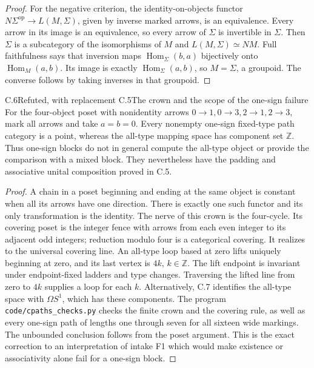 \begin{proof}
For the negative criterion, the identity-on-objects functor
$N\Sigma^{\mathrm{op}}\to L(M,\Sigma)$, given by inverse
marked arrows, is an equivalence. Every arrow in its image is an
equivalence, so every arrow of $\Sigma$ is invertible in $\Sigma$.
Then $\Sigma$ is a subcategory of the isomorphisms of $M$ and
$L(M,\Sigma)\simeq NM$. Full faithfulness says that inversion
maps $\operatorname{Hom}_\Sigma(b,a)$ bijectively onto
$\operatorname{Hom}_M(a,b)$. Its image is exactly
$\operatorname{Hom}_\Sigma(a,b)$, so $M=\Sigma$, a groupoid.
The converse follows by taking inverses in that groupoid.
\end{proof}

\begin{claim}{C.6}{Refuted, with replacement C.5}{The crown and the scope of the one-sign failure}
For the four-object poset with nonidentity arrows
$0\to1,0\to3,2\to1,2\to3$, mark all arrows and take $a=b=0$.
Every nonempty one-sign fixed-type path category is a point, whereas
the all-type mapping space has component set $\mathbb Z$.
Thus one-sign blocks do not in general compute the all-type object
or provide the comparison with a mixed block. They nevertheless
have the padding and associative unital composition proved in C.5.
\end{claim}
\begin{proof}
A chain in a poset beginning and ending at the same object is
constant when all its arrows have one direction. There is exactly
one such functor and its only transformation is the identity.
The nerve of this crown is the four-cycle. Its covering poset is
the integer fence with arrows from each even integer to its adjacent
odd integers; reduction modulo four is a categorical covering.
It realizes to the universal covering line. An all-type loop based
at zero lifts uniquely beginning at zero, and its last vertex is
$4k$, $k\in\mathbb Z$. The lift endpoint is invariant under
endpoint-fixed ladders and type changes. Traversing the lifted
line from zero to $4k$ supplies a loop for each $k$. Alternatively,
C.7 identifies the all-type space with $\Omega S^1$, which has
these components. The program \texttt{code/cpaths\_checks.py}
checks the finite crown and the covering rule, as well as every
one-sign path of lengths one through seven for all sixteen wide
markings. The unbounded conclusion follows from the poset argument.
This is the exact correction to an interpretation of intake F1
which would make existence or associativity alone fail for a
one-sign block.
\end{proof}

